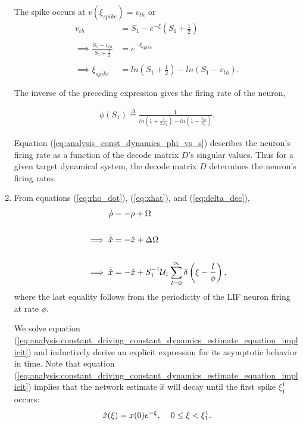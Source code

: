 \begin{enumerate}
The spike occurs at $v(\xi_{spike}) = v_{th}$ or 
\begin{align*}
v_{th} &= S_1 - e^
{
	-\xi
}
(
	S_1 + \frac		
		  {
			  1
		  }
		  {
			  2
		  }
 ) 
%
\\
\\
%
\implies 
\frac
{
	S_1 - v_{th}  
}
{
	S_1 + \frac
		  {
		       1
		  }
		  {
		  	   2
		  }
}
&=
e^
{
	-\xi_{spike}
}
%
\\
\\
%
\implies
\xi_{spike}
&= 
ln
(
	S_1 + \frac
			{
				1
			}
			{
				2
			}
)
- 
ln
(
	S_1 - v_{th}
).
\end{align*}

The inverse of the preceding expression gives the firing rate of the neuron,

\begin{align}
\label{eq:analysis_const_dynamics_phi_vs_s}
\phi(S_1)
\overset{\Delta}{=}
\frac
{
	1
} 
{
	ln
	(
		1 + \frac
				{
					1
				}
				{
					2 \, S_1
				}
	)
	- 
	ln
	(
		1 - \frac
			{
				v_{th}
			}
			{
				S_1
			}
	)
}.
\end{align}

Equation (\ref{eq:analysis_const_dynamics_phi_vs_s}) describes the neuron's firing rate as a function of the decode matrix $D$'s singular values. Thus for a given target dynamical system, the decode matrix $D$ determines the neuron's firing rates. 

\item From equations (\ref{eq:rho_dot}), (\ref{eq:xhat}), and (\ref{eq:delta_dec}),
\begin{align}
\label{eq:analysis:constant_driving_constant_dynamics_estimate_equation_implicit}
\dot
{
	\rho
}
&= 	- \rho  + \Omega \notag
% 
\\ \notag
\\ \notag
%
\implies
\dot{
	\hat
	{
		x
	}
}
&= 
-\hat
{
	x
}
+ \Delta \Omega
\\ \notag
\\ 
%
\implies
\dot
{
	\hat
	{
		x
	}
}
&= 
-\hat
{
	x
}
+ S_1^
{
	-1
}
\mathcal
{
	U
}_1 
\sum_
{
	l=0
}
^
{
	\infty
}
\delta 
\left(
	\xi - \frac
		  {
			  l
		  }
		  {
			  \phi
		  }
\right),
\end{align}
where the last equality follows from the periodicity of the LIF neuron firing at rate $\phi$.

We solve equation (\ref{eq:analysis:constant_driving_constant_dynamics_estimate_equation_implicit}) and inductively derive an explicit expression for its asymptotic behavior in time. Note that equation (\ref{eq:analysis:constant_driving_constant_dynamics_estimate_equation_implicit}) implies that the network estimate $\hat{x}$ will decay until the first spike $\xi_1^1$ occurs:
\begin{align*}
\hat{x}(\xi) = x(0) e^{-\xi}, \hspace{4mm} 0 \leq \xi < \xi_1^1.
\end{align*}



\end{enumerate}
